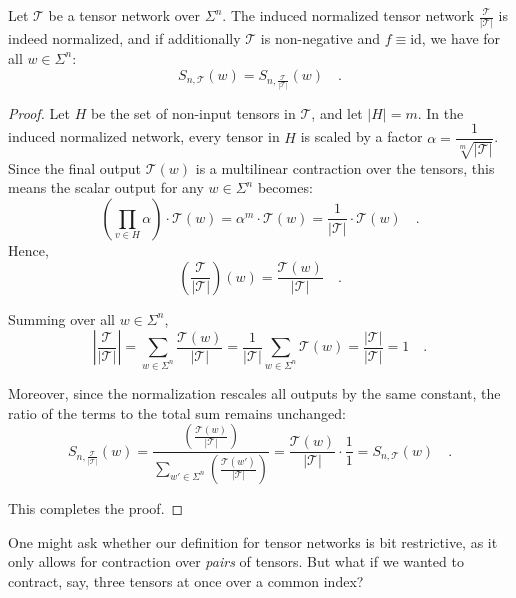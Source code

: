\documentclass[../../main.tex]{subfiles}
\begin{document}
    \begin{lemma}
        Let $\mathcal{T}$ be a tensor network over $\Sigma^n$. The induced normalized tensor network $\frac{\mathcal{T}}{|\mathcal{T}|}$ is indeed normalized, and if additionally $\mathcal{T}$ is non-negative and $f \equiv \text{id}$, we have for all $w \in \Sigma^n$:
        \[
            S_{n, \mathcal{T}}(w) = S_{n, \frac{\mathcal{T}}{|\mathcal{T}|}}(w) \quad .
        \]
    \end{lemma}
    \begin{proof}
        Let $H$ be the set of non-input tensors in $\mathcal{T}$, and let $|H| = m$. In the induced normalized network, every tensor in $H$ is scaled by a factor $\alpha = \dfrac{1}{\sqrt[m]{|\mathcal{T}|}}$. Since the final output $\mathcal{T}(w)$ is a multilinear contraction over the tensors, this means the scalar output for any $w \in \Sigma^n$ becomes:
        \[
            \left( \prod_{v \in H} \alpha \right) \cdot \mathcal{T}(w) = \alpha^m \cdot \mathcal{T}(w) = \frac{1}{|\mathcal{T}|} \cdot \mathcal{T}(w) \quad .
        \]
        Hence,
        \[
            \left(\frac{\mathcal{T}}{|\mathcal{T}|}\right)(w) = \frac{\mathcal{T}(w)}{|\mathcal{T}|} \quad .
        \]

        Summing over all \( w \in \Sigma^n \),
        \[
            \left| \frac{\mathcal{T}}{|\mathcal{T}|} \right| = \sum_{w \in \Sigma^n} \frac{\mathcal{T}(w)}{|\mathcal{T}|} = \frac{1}{|\mathcal{T}|} \sum_{w \in \Sigma^n} \mathcal{T}(w) = \frac{|\mathcal{T}|}{|\mathcal{T}|} = 1 \quad .
        \]

        Moreover, since the normalization rescales all outputs by the same constant, the ratio of the terms to the total sum remains unchanged:
        \[
            S_{n, \frac{\mathcal{T}}{|\mathcal{T}|}}(w) = \frac{\left( \frac{\mathcal{T}(w)}{|\mathcal{T}|} \right)}{\sum_{w' \in \Sigma^n} \left( \frac{\mathcal{T}(w')}{|\mathcal{T}|} \right)} = \frac{\mathcal{T}(w)}{|\mathcal{T}|} \cdot \frac{1}{1} = S_{n, \mathcal{T}}(w) \quad .
        \]

        This completes the proof.
    \end{proof}



    One might ask whether our definition for tensor networks is bit restrictive, as it only allows for contraction over \emph{pairs} of tensors. But what if we wanted to contract, say, three tensors at once over a common index?
\end{document}
